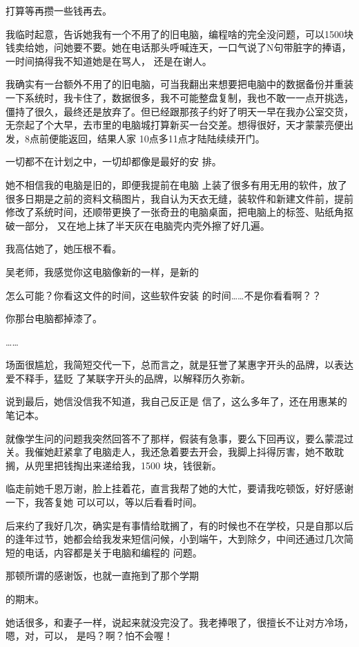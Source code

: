 \documentclass{article}
\begin{document}
打算等再攒一些钱再去。 

我临时起意，告诉她我有一个不用了的旧电脑，编程啥的完全没问题，可以1500块钱卖给她，问她要不要。她在电话那头呼喊连天，一口气说了N句带脏字的捧语，一时间搞得我不知道她是在骂人，
还是在谢人。 

我确实有一台额外不用了的旧电脑，可当我翻出来想要把电脑中的数据备份并重装一下系统时，我卡住了，数据很多，我不可能整盘复制，我也不敢一一点开挑选，僵持了很久，最终还是放弃了。但已经跟那孩子约好了明天一早在我办公室交货，无奈起了个大早，去市里的电脑城打算新买一台交差。想得很好，天才蒙蒙亮便出发，8点前便能返回，结果人家
10点多11点才陆陆续续开门。 

一切都不在计划之中，一切却都像是最好的安
排。 

她不相信我的电脑是旧的，即便我提前在电脑
\newpage
上装了很多有用无用的软件，放了很多日期是之前的资料文稿图片，我自认为天衣无缝，装软件和新建文件前，提前修改了系统时间，还顺带更换了一张奇丑的电脑桌面，把电脑上的标签、贴纸角抠破一部分，
又在地上抹了半天灰在电脑壳内壳外擦了好几遍。 


我高估她了，她压根不看。 

吴老师，我感觉你这电脑像新的一样，是新的

怎么可能？你看这文件的时间，这些软件安装
的时间……不是你看看啊？？ 


你那台电脑都掉漆了。 


…… 

场面很尴尬，我简短交代一下，总而言之，就是狂誉了某惠字开头的品牌，以表达爱不释手，猛贬
了某联字开头的品牌，以解释历久弥新。 

\newpage

说到最后，她信没信我不知道，我自己反正是
信了，这么多年了，还在用惠某的笔记本。 

就像学生问的问题我突然回答不了那样，假装有急事，要么下回再议，要么蒙混过关。我催她赶紧拿了电脑走人，我还急着要去开会，我脚上抖得厉害，她不敢耽搁，从兜里把钱掏出来递给我，1500
块，钱很新。 

临走前她千恩万谢，脸上挂着花，直言我帮了她的大忙，要请我吃顿饭，好好感谢一下，我答复她
可以可以，等以后看看时间。 

后来约了我好几次，确实是有事情给耽搁了，有的时候也不在学校，只是自那以后的逢年过节，她都会给我发来短信问候，小到端午，大到除夕，中间还通过几次简短的电话，内容都是关于电脑和编程的
问题。 

那顿所谓的感谢饭，也就一直拖到了那个学期

\newpage
的期末。 

她话很多，和妻子一样，说起来就没完没了。我老捧哏了，很擅长不让对方冷场，嗯，对，可以，
是吗？啊？怕不会喔！ 
\end{document}
